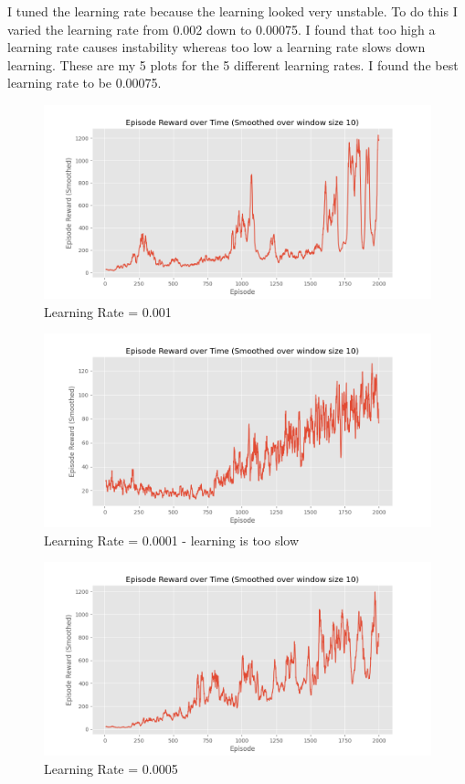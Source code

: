 \documentclass[a4paper]{article}
\theoremstyle{definition}
\begin{document}
I tuned the learning rate because the learning looked very unstable. To do this I varied the learning rate from 0.002 down to 0.00075. I found that too high a learning rate causes instability whereas too low a learning rate slows down learning. These are my 5 plots for the 5 different learning rates. I found the best learning rate to be 0.00075.

\begin{figure}[H]
    \centering
    \includegraphics[width=0.8\linewidth]{../lr001_smooth.png}
    \caption{Learning Rate = 0.001}
    \label{fig:1}
\end{figure}

\begin{figure}[H]
    \centering
    \includegraphics[width=0.8\linewidth]{../lr0001_smooth.png}
    \caption{Learning Rate = 0.0001 - learning is too slow}
    \label{fig:2}
\end{figure}

\begin{figure}[H]
    \centering
    \includegraphics[width=0.8\linewidth]{../lr0005_smooth.png}
    \caption{Learning Rate = 0.0005}
    \label{fig:3}
\end{figure}
\end{document}
